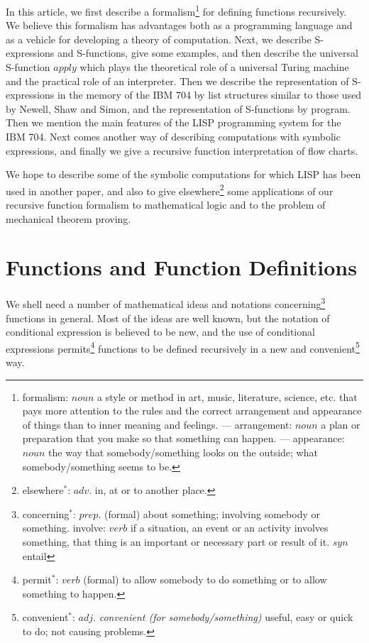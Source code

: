\documentclass[11pt, a4paper]{article}
\begin{document}
In this article, we first describe a
formalism\footnote{formalism: $noun$ a style or method in art, music,
  literature, science, etc. that pays more attention to the rules and the
  correct arrangement and appearance of things than to inner meaning and
  feelings. --- arrangement: $noun$ a plan or preparation that you make so that
  something can happen. --- appearance: $noun$ the way that somebody/something
  looks on the outside; what somebody/something seems to be.}
for defining functions
recursively. We believe this formalism has advantages both as a programming
language and as a vehicle for developing a theory of computation. Next, we
describe S-expressions and S-functions, give some examples, and then describe
the universal S-function $apply$ which plays the theoretical role of a universal
Turing machine and the practical role of an interpreter. Then we describe the
representation of S-expressions in the memory of the IBM 704 by list structures
similar to those used by Newell, Shaw and Simon, and the representation of
S-functions by program. Then we mention the main features of the LISP
programming system for the IBM 704. Next comes another way of describing
computations with symbolic expressions, and finally we give a recursive function
interpretation of flow charts.

We hope to describe some of the symbolic computations for which LISP has been
used in another paper, and also to give
elsewhere\footnote{elsewhere$^*$: $adv.$ in, at or to another place.}
some applications of our
recursive function formalism to mathematical logic and to the problem of
mechanical theorem proving.

\section{Functions and Function Definitions}

We shell need a number of mathematical ideas and notations
concerning\footnote{concerning$^*$: $prep.$ (formal) about something; involving
  somebody or something. involve: $verb$ if a situation, an event or an activity
  involves something, that thing is an important or necessary part or result of
  it. $syn$ entail}
functions
in general. Most of the ideas are well known, but the notation of conditional
expression is believed to be new, and the use of conditional expressions
permits\footnote{permit$^*$: $verb$ (formal) to allow somebody to do something
  or to allow something to happen.}
functions to be defined recursively in a new and
convenient\footnote{convenient$^*$: $adj.$ \textit{convenient (for
    somebody/something)} useful, easy or quick to do; not causing problems.}
way.
\end{document}
